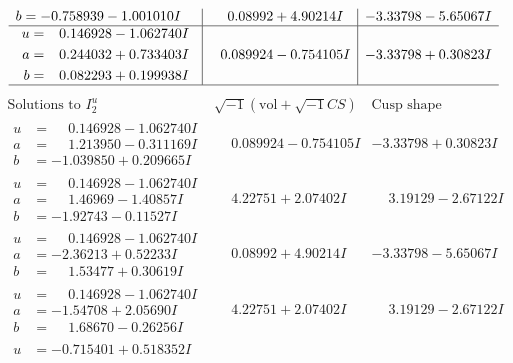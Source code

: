 \documentclass[1p]{elsarticle_modified}
\theoremstyle{definition}
\newcommand{\I}{\sqrt{-1}}
\begin{document}
$$\begin{array}{c|c|c}
\begin{aligned}
b &= -0.758939 - 1.001010 I\end{aligned}
 & \phantom{-}0.08992 + 4.90214 I & -3.33798 - 5.65067 I \\ \hline\begin{aligned}
u &= \phantom{-}0.146928 - 1.062740 I \\
a &= \phantom{-}0.244032 + 0.733403 I \\
b &= \phantom{-}0.082293 + 0.199938 I\end{aligned}
 & \phantom{-}0.089924 - 0.754105 I & -3.33798 + 0.30823 I\\
 \hline 
 \end{array}$$\newpage$$\begin{array}{c|c|c}  
\text{Solutions to }I^u_{2}& \I (\text{vol} + \sqrt{-1}CS) & \text{Cusp shape}\\
 \hline 
\begin{aligned}
u &= \phantom{-}0.146928 - 1.062740 I \\
a &= \phantom{-}1.213950 - 0.311169 I \\
b &= -1.039850 + 0.209665 I\end{aligned}
 & \phantom{-}0.089924 - 0.754105 I & -3.33798 + 0.30823 I \\ \hline\begin{aligned}
u &= \phantom{-}0.146928 - 1.062740 I \\
a &= \phantom{-}1.46969 - 1.40857 I \\
b &= -1.92743 - 0.11527 I\end{aligned}
 & \phantom{-}4.22751 + 2.07402 I & \phantom{-}3.19129 - 2.67122 I \\ \hline\begin{aligned}
u &= \phantom{-}0.146928 - 1.062740 I \\
a &= -2.36213 + 0.52233 I \\
b &= \phantom{-}1.53477 + 0.30619 I\end{aligned}
 & \phantom{-}0.08992 + 4.90214 I & -3.33798 - 5.65067 I \\ \hline\begin{aligned}
u &= \phantom{-}0.146928 - 1.062740 I \\
a &= -1.54708 + 2.05690 I \\
b &= \phantom{-}1.68670 - 0.26256 I\end{aligned}
 & \phantom{-}4.22751 + 2.07402 I & \phantom{-}3.19129 - 2.67122 I \\ \hline\begin{aligned}
u &= -0.715401 + 0.518352 I \\

\end{aligned}
\end{array}$$
\end{document}

